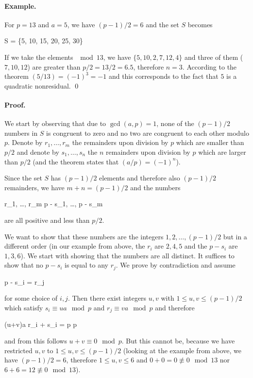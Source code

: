 \paragraph{Example.} For $p=13$ and $a=5$, we have $(p-1)/2 = 6$ and the set $S$ becomes

\bee
S = \{5, 10, 15, 20, 25, 30\}
\eee

If we take the elements $\mod 13$, we have $\{5, 10, 2, 7, 12, 4\}$ and three of them ($7, 10, 12$) are greater than $p/2 = 13/2=6.5$, therefore $n=3$. According to the theorem $(5/13) = (-1)^3 = -1$ and this corresponds to the fact that $5$ is a quadratic nonresidual. \qed

\paragraph{Proof.} We start by observing that due to $\gcd(a,p)=1$, none of the $(p-1)/2$ numbers in $S$ is congruent to zero
and no two are congruent to each other modulo $p$. Denote by $r_1, \ldots, r_m$ the remainders upon division by $p$ which are smaller than $p/2$ and denote by $s_1, \ldots, s_n$ the $n$ remainders upon division by $p$ which are larger than $p/2$ (and the theorem states that $(a/p) = (-1)^n$). 

Since the set $S$ has $(p-1)/2$ elements and therefore also $(p-1)/2$ remainders, we have $m + n = (p-1)/2$ and the numbers

\bee
r_1, \ldots, r_m \quad {} \quad p - s_1, \ldots, p - s_m
\eee

are all positive and less than $p/2$.

We want to show that these numbers are the integers $1, 2, \ldots, (p-1)/2$ but in a different order (in our example from above, the $r_i$ are $2, 4, 5$ and the $p - s_i$ are $1, 3, 6$). We start with showing that the numbers are all distinct. It suffices to show that no $p - s_i$ is equal to any $r_j$. We prove by contradiction and assume 

\bee
p - s_i = r_j
\eee

for some choice of $i, j$. Then there exist integers $u, v$ with $1 \leq u, v \leq (p-1)/2$ which satisfy $s_i \equiv u a \mod p$ and $r_j \equiv v a \mod p$ and therefore

\bee
(u+v)a \equiv r_i + s_i = p  \mod p
\eee

and from this follows $u + v \equiv 0 \mod p$. But this cannot be, because we have restricted $u, v$ to $1 \leq u, v \leq (p-1)/2$ (looking at the example from above, we have $(p-1)/2 = 6$, therefore $1 \leq u,v \leq 6$ and $0 + 0 = 0 \not\equiv 0 \mod 13$ nor $6 + 6 = 12 \not\equiv 0 \mod 13$).


